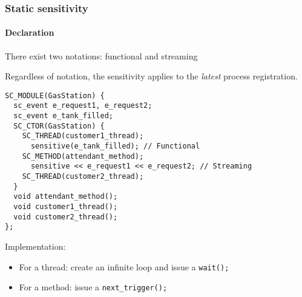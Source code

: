 \begin{frame}[fragile]
\frametitle{Static sensitivity}
\framesubtitle{Declaration}

\begin{block}{There exist two notations: functional and streaming}
\vspace{0.5em}
{\scriptsize
Regardless of notation, the sensitivity applies to the {\em latest} process registration.
\begin{verbatim}
SC_MODULE(GasStation) {
  sc_event e_request1, e_request2;
  sc_event e_tank_filled;
  SC_CTOR(GasStation) {
    SC_THREAD(customer1_thread);
      sensitive(e_tank_filled); // Functional
    SC_METHOD(attendant_method);
      sensitive << e_request1 << e_request2; // Streaming
    SC_THREAD(customer2_thread);
  }
  void attendant_method();
  void customer1_thread();
  void customer2_thread();
};
\end{verbatim}
\vspace{-0.5em}
\pause
Implementation:
\begin{itemize}
\item For a thread: create an infinite loop and issue a \texttt{wait();}
\item For a method: issue a \texttt{next\_trigger();}
\end{itemize}
}
\end{block}
\end{frame}